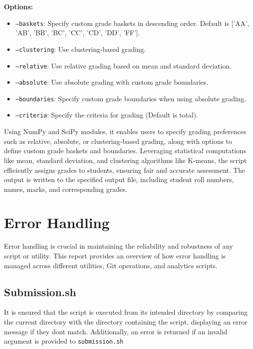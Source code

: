 \documentclass{article}
\begin{document}
\textbf{Options:}
\begin{itemize}
    \item \texttt{--baskets}: Specify custom grade baskets in descending order. Default is ['AA', 'AB', 'BB', 'BC', 'CC', 'CD', 'DD', 'FF'].
    \item \texttt{--clustering}: Use clustering-based grading.
    \item \texttt{--relative}: Use relative grading based on mean and standard deviation.
    \item \texttt{--absolute}: Use absolute grading with custom grade boundaries.
    \item \texttt{--boundaries}: Specify custom grade boundaries when using absolute grading.
    \item \texttt{--criteria}: Specify the criteria for grading (Default is total).
\end{itemize}

Using NumPy and SciPy modules, it enables users to specify grading preferences such as relative, absolute, or clustering-based grading, along with options to define custom grade baskets and boundaries. Leveraging statistical computations like mean, standard deviation, and clustering algorithms like K-means, the script efficiently assigns grades to students, ensuring fair and accurate assessment. The output is written to the specified output file, including student roll numbers, names, marks, and corresponding grades.

\section{Error Handling}

Error handling is crucial in maintaining the reliability and robustness of any script or utility. This report provides an overview of how error handling is managed across different utilities, Git operations, and analytics scripts.

\subsection{Submission.sh}
It is ensured that the script is executed from its intended directory by comparing the current directory with the directory containing the script, displaying an error message if they dont match. Additionally, an error is returned if an invalid argument is provided to \texttt{submission.sh}
\end{document}

